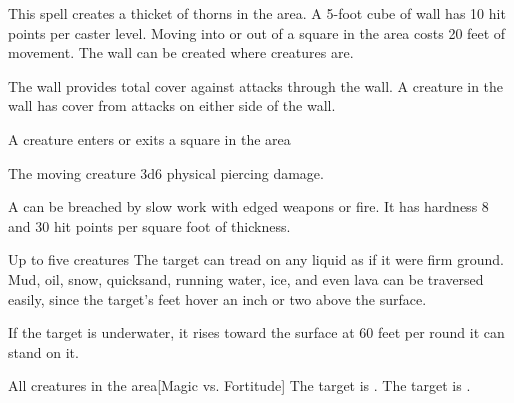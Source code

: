 \begin{spellheader}
    \spelldur{\durlong \dismissable}
    \spelleffect This spell creates a thicket of thorns in the area. A 5-foot cube of wall has 10 hit points per caster level. Moving into or out of a square in the area costs 20 feet of movement. The wall can be created where creatures are.

    The wall provides total cover against attacks through the wall. A creature in the wall has cover from attacks on either side of the wall.
\end{spellheader}
\begin{spelleffects}
    \begin{spelltrigger}{A creature enters or exits a square in the area}
        \begin{spelltarget}{The moving creature}
            \spelleffect 3d6 physical piercing damage.
        \end{spelltarget}
    \end{spelltrigger}
\end{spelleffects}
\begin{spellfooter}
    \spellnotes A  can be breached by slow work with edged weapons or fire. It has hardness 8 and 30 hit points per square foot of thickness.
\end{spellfooter}

\begin{spellheader}
    \spelldur{\durlong \dismissable}
\end{spellheader}
\begin{spelleffects}
    \begin{spelltargets}{Up to five creatures}
        \spelleffect The target can tread on any liquid as if it were firm ground. Mud, oil, snow, quicksand, running water, ice, and even lava can be traversed easily, since the target's feet hover an inch or two above the surface.
        \par If the target is underwater, it rises toward the surface at 60 feet per round it can stand on it.
    \end{spelltargets}
\end{spelleffects}

\begin{spellheader}
    \spelldur{\durshort}
\end{spellheader}
\begin{spelleffects}
    \begin{spelltargets}{All creatures in the area}[Magic vs. Fortitude]
        \spellsuccess The target is \exhausted.
        \spellfailure The target is \fatigued.
    \end{spelltargets}
\end{spelleffects}

